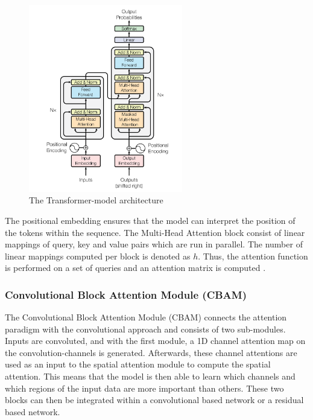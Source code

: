 \begin{figure}[H]
    \centering
    \includegraphics[width=0.6\textwidth]{Figures/Transformer.png}
    \caption{The Transformer-model architecture \cite{vaswani_attention_2023}}
    \label{fig:transformer_model}
\end{figure}

The positional embedding ensures that the model can interpret the position of the tokens within the sequence. The Multi-Head Attention block consist of linear mappings of query, key and value pairs which are run in parallel. The number of linear mappings computed per block is denoted as $h$. Thus, the attention function is performed on a set of queries and an attention matrix is computed \cite{vaswani_attention_2023}.

\subsubsection{Convolutional Block Attention Module (CBAM)}
The Convolutional Block Attention Module (CBAM) connects the attention paradigm with the convolutional approach and consists of two sub-modules. Inputs are convoluted, and with the first module, a 1D channel attention map on the convolution-channels is generated. Afterwards, these channel attentions are used as an input to the spatial attention module to compute the spatial attention. This means that the model is then able to learn which channels and which regions of the input data are more important than others. These two blocks can then be integrated within a convolutional based network or a residual based network.

